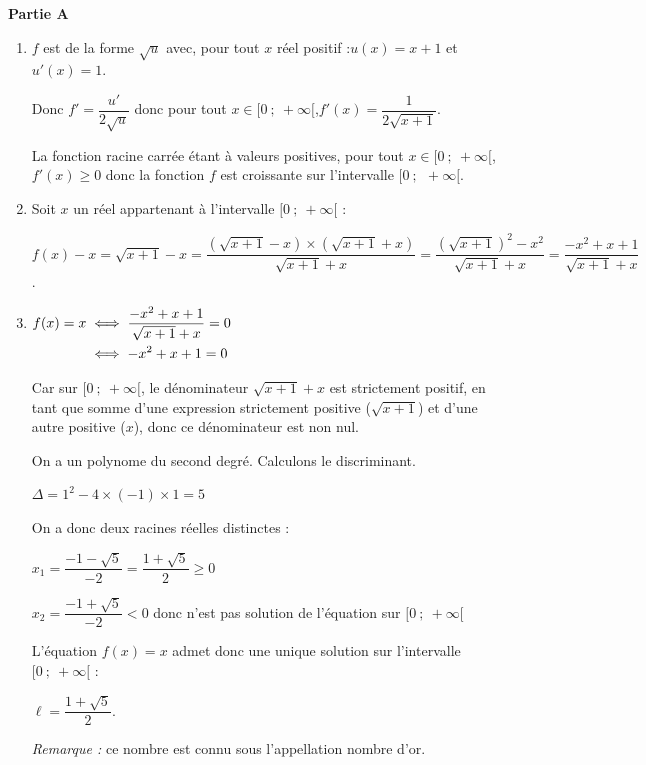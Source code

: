 
\medskip
\textbf{Partie A}

\begin{enumerate}
	\item  $f$ est de la forme $\sqrt{u}$ avec, pour tout $x$ réel positif :\quad  $u(x)= x+1$ \quad et \quad $u'(x)=1$.

	Donc \quad $f'= \dfrac{u'}{2\sqrt{u}}$ \quad donc pour tout $x \in [0~;~+\infty[$,\quad  $f'(x) =   \dfrac{1}{2\sqrt{x+1}}$.

	La fonction racine carrée étant à valeurs positives, pour tout $x \in [0~;~+\infty[$, $f'(x) \geqslant 0$  donc la fonction $f$ est croissante  sur l'intervalle $[0~;~~+\infty[$.

	\item Soit $x$ un réel appartenant à l'intervalle $[0~;~+\infty[$ :

	$f(x) - x =  \sqrt{x+1} -x =    \dfrac {   \left(  \sqrt{x+1} -x    \right) \times   \left(  \sqrt{x+1} +x    \right)  }    {  \sqrt{x+1} +x    }    =      \dfrac {   \left(  \sqrt{x+1}    \right) ^2- x^2  } {   \sqrt{x+1} +x     }     =      \dfrac{-x^2 + x + 1}{\sqrt{x + 1} + x}$.


	\item  $\aligned[t] f(x) = x &\iff  \dfrac{-x^2 + x + 1}{\sqrt{x + 1} + x} = 0  \\
	&\iff -x^2+x+1=0\endaligned$

	Car sur $[0~;~+\infty[$, le dénominateur $\sqrt{x+1} + x$ est strictement positif, en tant que somme d'une expression strictement positive ($\sqrt{x+1}$) et d'une autre positive ($x$), donc ce dénominateur est non nul.

	On a un polynome du second degré. Calculons le discriminant.

	$\Delta = 1^2-4 \times (-1) \times 1= 5$

	On a donc deux racines réelles distinctes :

	$x_1 = \dfrac{-1-\sqrt{5}}{-2}= \dfrac{1 +\sqrt 5}{2}\geqslant 0$


	$x_2= \dfrac{-1+\sqrt{5}}{-2}<0$ \quad donc n'est pas solution de l'équation sur $[0~;~+\infty[$


	L'équation $f(x)=x$ admet donc une unique solution  sur l'intervalle $[0~;~+\infty[$ :

	$\ell = \dfrac{1 +\sqrt 5}{2}$.

	\emph{Remarque :} ce nombre est connu sous l'appellation \og nombre d'or\fg{}.

\end{enumerate}

